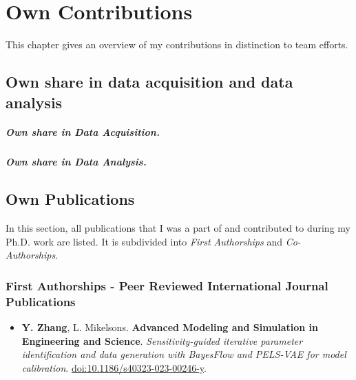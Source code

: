 \chapter*{Own Contributions}
\label{chap:contributions}

This chapter gives an overview of my contributions in distinction to team efforts.


\section*{Own share in data acquisition and data analysis}
{}
\label{sec:own-data-acquisition}

    


\paragraph{Own share in Data Acquisition.}
 

\paragraph{Own share in Data Analysis.}

        
        

\section*{Own Publications}
\label{sec:own-publications}

In this section, all publications that I was a part of and contributed to during my Ph.D. work are listed. It is subdivided into \textit{First Authorships} and \textit{Co-Authorships}.
\hfill \break

\subsection*{First Authorships - Peer Reviewed International Journal Publications} \label{sec:publications:peer_reviewed_journal_first}

\begin{itemize}
    \item[] \textbf{Y. Zhang}, L. Mikelsons. \textbf{Advanced Modeling and Simulation in Engineering and Science}. \textit{Sensitivity-guided iterative parameter identification and data generation with BayesFlow and PELS-VAE for model calibration}. \url{doi:10.1186/s40323-023-00246-y}.
\end{itemize}

